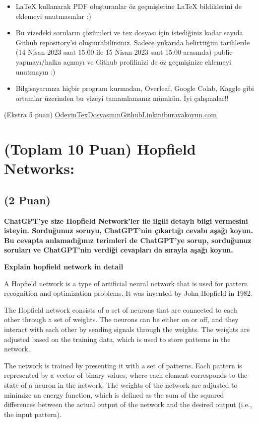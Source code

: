 \documentclass[11pt]{article}
\begin{document}
\begin{itemize}
    \item LaTeX kullanarak PDF oluşturanlar öz geçmişlerine LaTeX bildiklerini de eklemeyi unutmasınlar :)
    \item Bu vizedeki soruların çözümleri ve tex dosyası için istediğiniz kadar sayıda Github repository'si oluşturabilirsiniz. Sadece yukarıda belirttiğim tarihlerde (14 Nisan 2023 saat 15:00 ile 15 Nisan 2023 saat 15:00 arasında) public yapmayı/halka açmayı ve Github profilinizi de öz geçmişinize eklemeyi unutmayın :)
    \item Bilgisayarınıza hiçbir program kurmadan, Overleaf, Google Colab, Kaggle gibi ortamlar üzerinden bu vizeyi tamamlamanız mümkün. İyi çalışmalar!!
\end{itemize}

(Ekstra 5 puan) \url{OdevinTexDosyasınınGithubLinkiniburayakoyun.com}

\newpage
\section{(Toplam 10 Puan) Hopfield Networks:}

\subsection{(2 Puan)} \textbf{ChatGPT’ye size Hopfield Network’ler ile ilgili detaylı bilgi vermesini isteyin. Sorduğunuz soruyu, ChatGPT'nin çıkartığı cevabı aşağı koyun. Bu cevapta anlamadığınız terimleri de ChatGPT’ye sorup, sorduğunuz soruları ve ChatGPT’nin verdiği cevapları da sırayla aşağı koyun.}

\textbf{Explain hopfield network in detail}

A Hopfield network is a type of artificial neural network that is used for pattern recognition and optimization problems. It was invented by John Hopfield in 1982.

The Hopfield network consists of a set of neurons that are connected to each other through a set of weights. The neurons can be either on or off, and they interact with each other by sending signals through the weights. The weights are adjusted based on the training data, which is used to store patterns in the network.

The network is trained by presenting it with a set of patterns. Each pattern is represented by a vector of binary values, where each element corresponds to the state of a neuron in the network. The weights of the network are adjusted to minimize an energy function, which is defined as the sum of the squared differences between the actual output of the network and the desired output (i.e., the input pattern).
\end{document}
